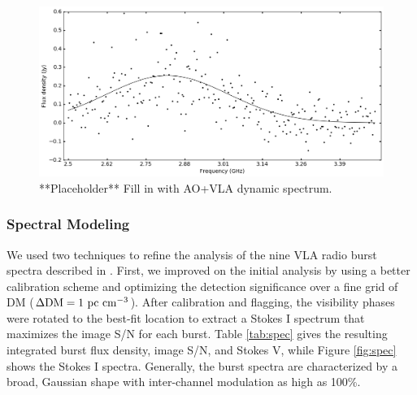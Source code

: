 \documentclass[twocolumn]{aastex61}
\begin{document}
\begin{figure}[htb]
\begin{center}
%
%
 \includegraphics[width=1.9\columnwidth]{spec_57648.png}
 \caption{**Placeholder** Fill in with AO+VLA dynamic spectrum.
 \label{fig:sgram}}
\end{center}
\end{figure}


\subsubsection{Spectral Modeling}
\label{sec:spec}
We used two techniques to refine the analysis of the nine VLA radio burst spectra described in \citet{LOC}. First, we improved on the initial analysis by using a better calibration scheme and optimizing the detection significance over a fine grid of DM ($\Delta \rm{DM}=1\ \rm{pc}\ \rm{cm}^{-3}$). After calibration and flagging, the visibility phases were rotated to the best-fit location \citep[(RA, Dec) $=$ (05h31m58.70s, +33d08m52.5s);][]{LOC} to extract a Stokes I spectrum that maximizes the image S/N for each burst. Table \ref{tab:spec} gives the resulting integrated burst flux density, image S/N, and Stokes V, while Figure \ref{fig:spec} shows the Stokes I spectra. Generally, the burst spectra are characterized by a broad, Gaussian shape with inter-channel modulation as high as 100\%.
\end{document}
